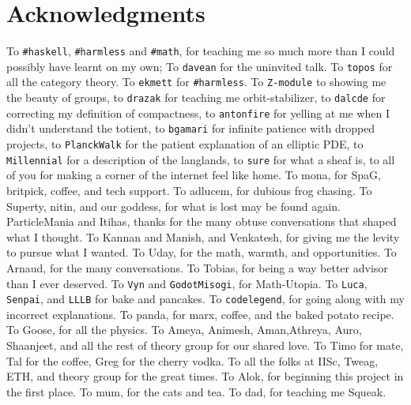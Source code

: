 \documentclass[11pt]{book}
\renewcommand{\baselinestretch}{1.2}
\begin{document}



\newpage
\thispagestyle{empty}
\renewcommand{\thesisdedication}{{\large Copyright \copyright~~Siddharth Bhat, 2021\\}{\large All Rights Reserved\\}}
\thesisdedicationpage



\newpage
\thispagestyle{empty}
\renewcommand{\thesisdedication}{\large To \texttt{\#math}, \texttt{\#haskell}, and \texttt{\#harmless}}
\thesisdedicationpage

\mastersthesis
\renewcommand{\baselinestretch}{1.5}

\chapter*{Acknowledgments}
\label{ch:ack}
To \texttt{\#haskell}, \texttt{\#harmless} and \texttt{\#math}, for teaching me
so much more than I could possibly have learnt on my own; To \texttt{davean}
for the uninvited talk. To \texttt{topos} for all the category theory. To
\texttt{ekmett} for \texttt{\#harmless}. To \texttt{Z-module} to showing me the
beauty of groups, to \texttt{drazak} for teaching me orbit-stabilizer, to
\texttt{dalcde} for correcting my definition of compactness, to
\texttt{antonfire} for yelling at me when I didn't understand the totient, to
\texttt{bgamari} for infinite patience with dropped projects, to
\texttt{PlanckWalk} for the patient explanation of an elliptic PDE, to
\texttt{Millennial} for a description of the langlands, to \texttt{sure} for
what a sheaf is, to all of you for making a corner of the internet feel like
home. To mona, for SpaG, britpick, coffee, and tech support. To adlucem, for
dubious frog chasing. To Superty, nitin, and our goddess, for what is lost may
be found again. ParticleMania and Itihas, thanks for the many obtuse
conversations that shaped what I thought. To Kannan and Manish, and Venkatesh,
for giving me the levity to pursue what I wanted. To Uday, for the math,
warmth, and opportunities. To Arnaud, for the many conversations. To Tobias,
for being a way better advisor than I  ever deserved.  To \texttt{Vyn} and
\texttt{GodotMisogi}, for Math-Utopia. To \texttt{Luca}, \texttt{Senpai}, and
\texttt{LLLB} for bake and pancakes. To \texttt{codelegend}, for going along
with my incorrect explanations. To panda, for marx, coffee, and the baked
potato recipe. To Goose, for all the physics.  To Ameya, Animesh, Aman,Athreya,
Auro, Shaanjeet, and all the rest of theory group for our shared love. To  Timo
for mate, Tal for the coffee, Greg for the cherry vodka. To all the folks at
IISc, Tweag,  ETH, and theory group for the great times. To Alok, for beginning
this project in the first place. To mum, for the cats and tea. To dad, for
teaching me Squeak.
\end{document}
